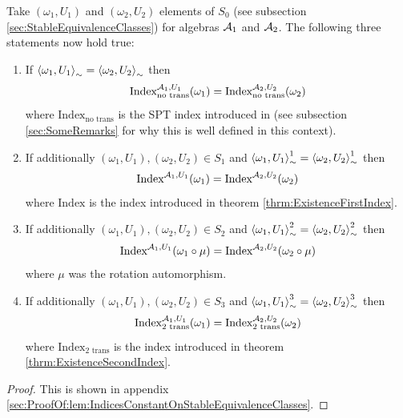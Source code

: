 \documentclass[12pt,a4paper,twoside]{article}
\numberwithin{equation}{section}
\begin{document}
\begin{lemma}\label{lem:IndicesConstantOnStableEquivalenceClasses}
	Take $(\omega_1,U_1)$ and $(\omega_2,U_2)$ elements of $S_0$ (see subsection \ref{sec:StableEquivalenceClasses}) for algebras $\AA_1$ and $\AA_2$. The following three statements now hold true:
	\begin{enumerate}
		\item If $\expval{\omega_1,U_1}_\sim=\expval{\omega_2,U_2}_\sim$ then
		\begin{equation}
			\textrm{Index}^{\AA_1,U_1}_{\text{no trans}}(\omega_1)=\textrm{Index}^{\AA_2,U_2}_{\text{no trans}}(\omega_2)
		\end{equation}
		where $\textrm{Index}_{\text{no trans}}$ is the SPT index introduced in \cite{ogata2021h3gmathbb} (see subsection \ref{sec:SomeRemarks} for why this is well defined in this context).
		\item If additionally $(\omega_1,U_1),(\omega_2,U_2)\in S_1$ and $\expval{\omega_1,U_1}_\sim^1=\expval{\omega_2,U_2}_\sim^1$ then
		\begin{equation}
			\textrm{Index}^{\AA_1,U_1}(\omega_1)=\textrm{Index}^{\AA_2,U_2}(\omega_2)
		\end{equation}
		where $\textrm{Index}$ is the index introduced in theorem \ref{thrm:ExistenceFirstIndex}.
		\item If additionally $(\omega_1,U_1),(\omega_2,U_2)\in S_2$ and $\expval{\omega_1,U_1}_\sim^2=\expval{\omega_2,U_2}_\sim^2$ then
		\begin{equation}
			\textrm{Index}^{\AA_1,U_1}(\omega_1\circ\mu)=\textrm{Index}^{\AA_2,U_2}(\omega_2\circ\mu)
		\end{equation}
		where $\mu$ was the rotation automorphism.
		\item If additionally $(\omega_1,U_1),(\omega_2,U_2)\in S_3$ and $\expval{\omega_1,U_1}_\sim^3=\expval{\omega_2,U_2}_\sim^3$ then
		\begin{equation}
			\textrm{Index}^{\AA_1,U_1}_{\text{2 trans}}(\omega_1)=\textrm{Index}^{\AA_2,U_2}_{\text{2 trans}}(\omega_2)
		\end{equation}
		where $\textrm{Index}_{\text{2 trans}}$ is the index introduced in theorem \ref{thrm:ExistenceSecondIndex}.
	\end{enumerate}
\end{lemma}
\begin{proof}
	This is shown in appendix \ref{sec:ProofOf:lem:IndicesConstantOnStableEquivalenceClasses}.
\end{proof}
\end{document}
